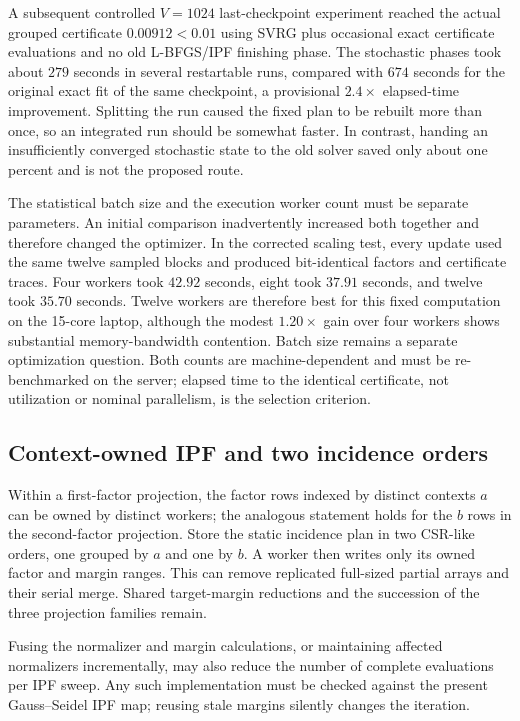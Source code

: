 \documentclass[11pt]{article}
\begin{document}
A subsequent controlled $V=1024$ last-checkpoint experiment reached the
actual grouped certificate $0.00912<0.01$ using SVRG plus occasional exact
certificate evaluations and no old L-BFGS/IPF finishing phase.  The
stochastic phases took about $279$ seconds in several restartable runs,
compared with $674$ seconds for the original exact fit of the same checkpoint,
a provisional $2.4\times$ elapsed-time improvement.  Splitting the run caused
the fixed plan to be rebuilt more than once, so an integrated run should be
somewhat faster.  In contrast, handing an insufficiently converged stochastic
state to the old solver saved only about one percent and is not the proposed
route.

The statistical batch size and the execution worker count must be separate
parameters.  An initial comparison inadvertently increased both together and
therefore changed the optimizer.  In the corrected scaling test, every update
used the same twelve sampled blocks and produced bit-identical factors and
certificate traces.  Four workers took $42.92$ seconds, eight took $37.91$
seconds, and twelve took $35.70$ seconds.  Twelve workers are therefore best
for this fixed computation on the 15-core laptop, although the modest
$1.20\times$ gain over four workers shows substantial memory-bandwidth
contention.  Batch size remains a separate optimization question.  Both
counts are machine-dependent and must be re-benchmarked on the server;
elapsed time to the identical certificate, not utilization or nominal
parallelism, is the selection criterion.

\subsection{Context-owned IPF and two incidence orders}

Within a first-factor projection, the factor rows indexed by distinct
contexts $a$ can be owned by distinct workers; the analogous statement holds
for the $b$ rows in the second-factor projection.  Store the static incidence
plan in two CSR-like orders, one grouped by $a$ and one by $b$.  A worker then
writes only its owned factor and margin ranges.  This can remove replicated
full-sized partial arrays and their serial merge.  Shared target-margin
reductions and the succession of the three projection families remain.

Fusing the normalizer and margin calculations, or maintaining affected
normalizers incrementally, may also reduce the number of complete evaluations
per IPF sweep.  Any such implementation must be checked against the present
Gauss--Seidel IPF map; reusing stale margins silently changes the iteration.
\end{document}
